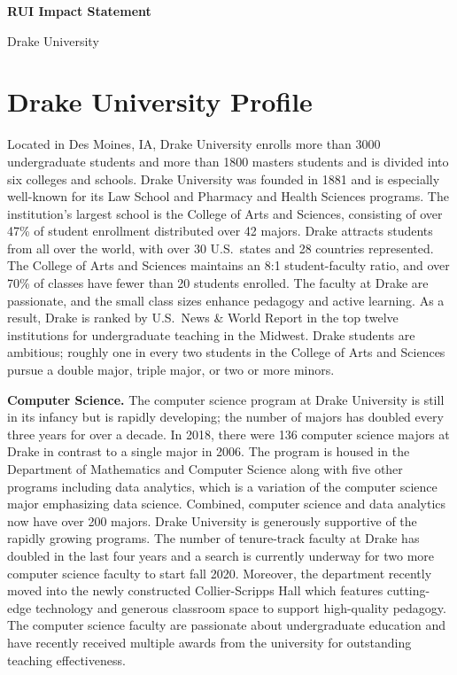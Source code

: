 \documentclass[11pt]{article}
\begin{document}
    \setcounter{page}{1}
    \begin{center}
        {\Large {\bf RUI Impact Statement}}
    \end{center}

    \begin{center}
        {\Large Drake University}
    \end{center}

    \section{Drake University Profile}
    Located in Des Moines, IA, Drake University enrolls more than 3000 undergraduate students and more than 1800 masters students
    and is divided into six colleges and schools.
    Drake University was founded in 1881 and is especially well-known for its Law School and Pharmacy and Health Sciences programs.
    The institution's largest school is the College of Arts and Sciences, consisting of over 47\% of student enrollment distributed over 42 majors.
    Drake attracts students from all over the world, with over 30 U.S.\ states and 28 countries represented.
    The College of Arts and Sciences maintains an 8:1 student-faculty ratio, and over 70\% of classes have fewer than 20 students enrolled.
    The faculty at Drake are passionate, and the small class sizes enhance pedagogy and active learning.
    As a result, Drake is ranked by U.S.\ News \& World Report in the top twelve institutions for undergraduate teaching in the Midwest.
    Drake students are ambitious; roughly one in every two students in the College of Arts and Sciences pursue a double major, triple major, or two or more minors.

    \textbf{Computer Science.}
    The computer science program at Drake University is still in its infancy but is rapidly developing; the number of majors has doubled every three years for over a decade.
    In 2018, there were 136 computer science majors at Drake in contrast to a single major in 2006.
    The program is housed in the Department of Mathematics and Computer Science along with five other programs including data analytics, which is a variation of the computer science major emphasizing data science.
    Combined, computer science and data analytics now have over 200 majors.
    Drake University is generously supportive of the rapidly growing programs.
    The number of tenure-track faculty at Drake has doubled
    in the last four years and a search is currently underway for two more computer science faculty to start fall 2020.
    Moreover, the department recently moved into the newly constructed Collier-Scripps Hall which features cutting-edge technology and generous classroom space to support high-quality pedagogy.
    The computer science faculty are passionate about undergraduate education and have recently received multiple awards from the university for outstanding teaching effectiveness.
\end{document}
